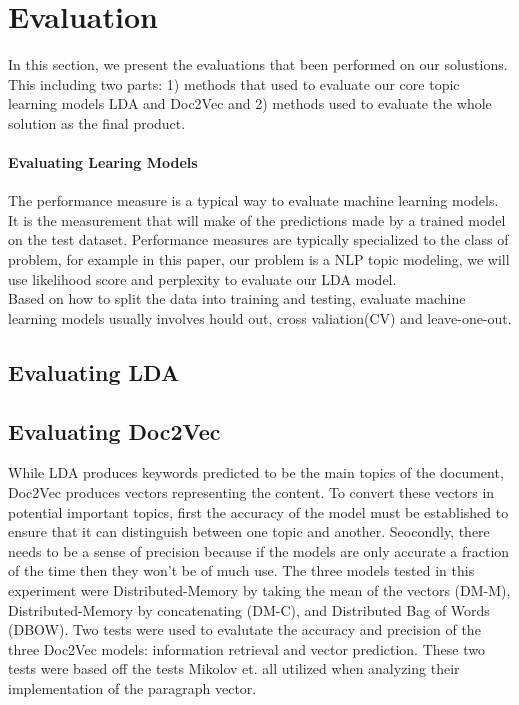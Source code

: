 
\section{Evaluation}
In this section, we present the evaluations that been performed on our solustions. This including two parts: 1) methods that used to evaluate our core topic learning models LDA and Doc2Vec and 2) methods used to evaluate the whole solution as the final product. 
\paragraph{Evaluating Learing Models}
The performance measure is a typical way to evaluate machine learning models. It is the measurement that will make of the predictions made by a trained model on the test dataset. Performance measures are typically specialized to the class of problem, for example in this paper, our problem is a NLP topic modeling, we will use likelihood score and perplexity to evaluate our LDA model.\\
Based on how to split the data into training and testing, evaluate machine learning models usually involves hould out, cross valiation(CV) and leave-one-out. 

\subsection{Evaluating LDA}


\subsection{Evaluating Doc2Vec}
While LDA produces keywords predicted to be the main topics of the document, Doc2Vec produces vectors representing the content. To convert these vectors in potential important topics, first the accuracy of the model must be established to ensure that it can distinguish between one topic and another. Seocondly, there needs to be a sense of precision because if the models are only accurate a fraction of the time then they won't be of much use. The three models tested in this experiment were  Distributed-Memory by taking the mean of the vectors (DM-M), Distributed-Memory by concatenating (DM-C), and Distributed Bag of Words (DBOW). Two tests were used to evalutate the accuracy and precision of the three Doc2Vec models: information retrieval and vector prediction. These two tests were based off the tests Mikolov et. all utilized when analyzing their implementation of the paragraph vector. \cite{RefWorks:doc:5a6e5746e4b0d609eec798d7}


